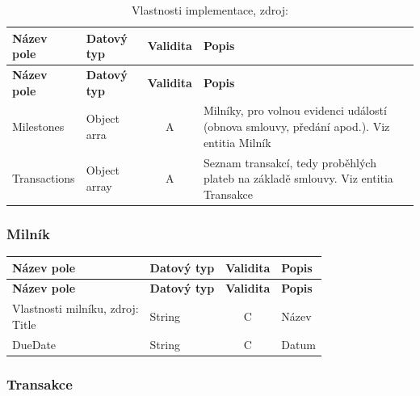 \begin{center}
\begin{longtable}{lp{20mm}cp{65mm}}
\label{grid_mlmmh} \\
\multicolumn{1}{l}{\textbf{Název pole}} & 
\multicolumn{1}{l}{\textbf{Datový typ}} & 
\multicolumn{1}{l}{\textbf{Validita}} & 
\multicolumn{1}{l}{\textbf{Popis}} \\ \hline 
\endfirsthead
\multicolumn{1}{l}{\textbf{Název pole}} & 
\multicolumn{1}{l}{\textbf{Datový typ}} & 
\multicolumn{1}{l}{\textbf{Validita}} & 
\multicolumn{1}{l}{\textbf{Popis}} \\ \hline 
\hline
\endhead
\endfoot
\caption{Vlastnosti implementace, zdroj:\protect\cite{metodika}}
\endlastfoot
\rowcolor{validateA}Milestones & Object arra & A & Milníky, pro volnou evidenci událostí (obnova smlouvy, předání apod.). Viz entitia Milník \\
\rowcolor{validateA}Transactions & Object array & A & Seznam transakcí, tedy proběhlých plateb na základě smlouvy. Viz entitia Transakce \\
\end{longtable}
\end{center}

\subsubsection*{Milník}

\begin{center}
\begin{longtable}{lp{20mm}cp{65mm}}
\label{grid_mlmmh} \\
\multicolumn{1}{l}{\textbf{Název pole}} & 
\multicolumn{1}{l}{\textbf{Datový typ}} & 
\multicolumn{1}{l}{\textbf{Validita}} & 
\multicolumn{1}{l}{\textbf{Popis}} \\ \hline 
\endfirsthead
\multicolumn{1}{l}{\textbf{Název pole}} & 
\multicolumn{1}{l}{\textbf{Datový typ}} & 
\multicolumn{1}{l}{\textbf{Validita}} & 
\multicolumn{1}{l}{\textbf{Popis}} \\ \hline 
\hline
\endhead
\endfoot
\caption{Vlastnosti milníku, zdroj:\\\protect\cite{metodika}}
\endlastfoot
\rowcolor{validateC}Title & String & C & Název \\
\rowcolor{validateC}DueDate & String & C & Datum \\
\end{longtable}
\end{center}

\subsubsection*{Transakce}

